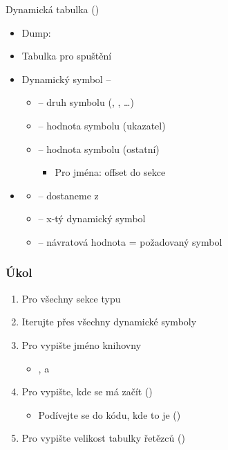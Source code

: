 \begin{frame}{Dynamická tabulka ()}

  \begin{itemize}
    \item Dump: 
    \item Tabulka pro spuštění

    \pause

    \item Dynamický symbol -- 
    \begin{itemize}[<+->]
      \item {} -- druh symbolu (, ,
        \dots)
      \item {} -- hodnota symbolu (ukazatel)
      \item {} -- hodnota symbolu (ostatní)
      \begin{itemize}
	\item Pro jména: offset do sekce 
      \end{itemize}
    \end{itemize}

    \pause

    \item {}
    \begin{itemize}
      \item {} -- dostaneme z 
      \item {} -- x-tý dynamický symbol
      \item {} -- návratová hodnota = požadovaný symbol
    \end{itemize}
  \end{itemize}

\end{frame}

\begin{frame}
  \frametitle{Úkol}

  \begin{enumerate}
    \item Pro všechny sekce typu 
    \item Iterujte přes všechny dynamické symboly
    \item Pro  vypište jméno knihovny
    \begin{itemize}
      \item {},  a 
    \end{itemize}

    \item Pro  vypište, kde se má začít ()
    \begin{itemize}
      \item Podívejte se do kódu, kde to je ()
    \end{itemize}
    \item Pro  vypište velikost tabulky řetězců ()
  \end{enumerate}

\end{frame}

